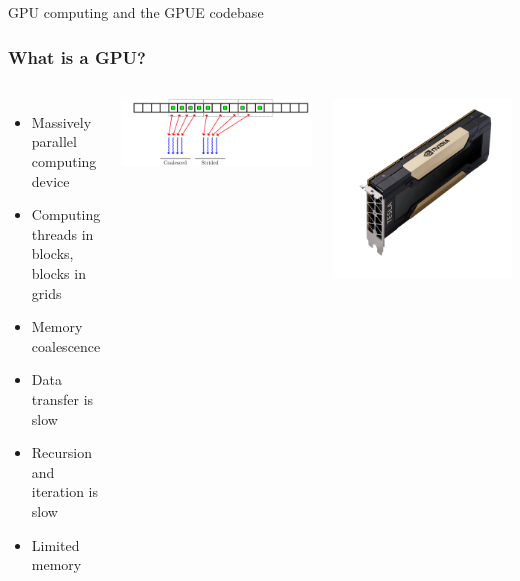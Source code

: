 \documentclass{beamer}
\begin{document}
\begin{frame}
\center \huge GPU computing and the GPUE codebase
\end{frame}

\begin{frame}
\frametitle{What is a GPU?}

\begin{columns}
\begin{itemize}
\item Massively parallel computing device
\item Computing threads in blocks, blocks in grids
\item Memory coalescence
\item Data transfer is slow
\item Recursion and iteration is slow
\item Limited memory
\end{itemize}

\includegraphics[width=\textwidth]{../data/gpu/coalesce/check.pdf}

\includegraphics[width=\textwidth]{v100.png}


\end{columns}
\end{frame}
\end{document}
